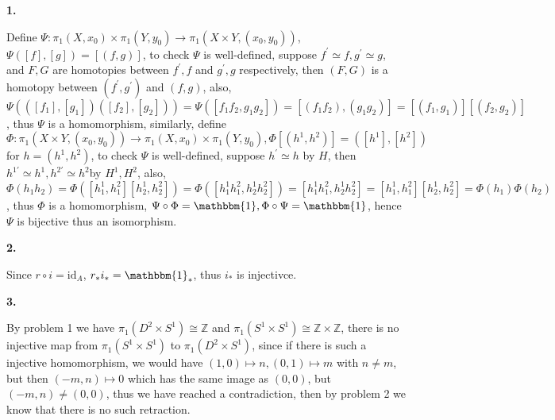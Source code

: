 \documentclass[12pt]{article}
\begin{document}
\textbf{1.} \par
Define $\Psi:\pi_{1}(X,x_{0})\times\pi_{1}(Y,y_{0})\rightarrow \pi_{1}\left(X\times Y,(x_{0},y_{0})\right)$, $\Psi([f],[g])=[(f,g)]$, to check $\Psi$ is well-defined, suppose $f^{'}\simeq f, g^{'}\simeq g$, and $F,G$ are homotopies between $f^{'},f$ and $g^{'},g$ respectively, then $(F,G)$ is a homotopy between $(f^{'},g^{'})$ and \((f,g)\), also, $\Psi\left(([f_{1}],[g_{1}])([f_{2}],[g_{2}])\right)=\Psi\left([f_{1}f_{2},g_{1}g_{2}]\right)=[(f_{1}f_{2}),(g_{1}g_{2})]=[(f_{1},g_{1})][(f_{2},g_{2})]$, thus $\Psi$ is a homomorphism, similarly, define $\Phi: \pi_{1}\left(X\times Y,(x_{0},y_{0})\right) \rightarrow \pi_{1}(X,x_{0})\times\pi_{1}(Y,y_{0}), \Phi[(h^{1},h^{2})]=([h^{1}],[h^{2}])$ for $h=(h^{1},h^{2})$, to check $\Psi$ is well-defined, suppose $h^{'}\simeq h$ by $H$, then $h^{1'}\simeq h^{1},h^{2'}\simeq h^{2}$by $H^{1},H^{2}$, also, $\Phi(h_{1}h_{2})=\Phi\left([h_{1}^{1},h_{1}^{2}][h_{2}^{1},h_{2}^{2}]\right)=\Phi\left([h_{1}^{1}h_{1}^{2},h_{2}^{1}h_{2}^{2}]\right)=[h_{1}^{1}h_{1}^{2},h_{2}^{1}h_{2}^{2}]=[h_{1}^{1},h_{1}^{2}][h_{2}^{1},h_{2}^{2}]=\Phi(h_{1})\Phi(h_{2})$, thus $\Phi$ is a homomorphism, $\Psi\circ\Phi=\mathbbm{1},\Phi\circ\Psi=\mathbbm{1}$, hence $\Psi$ is bijective thus an isomorphism. \par
\textbf{2.} \par
Since $r\circ i=\mathrm{id}_{A}$, $r_{*}i_{*}=\mathbbm{1}_{*}$, thus $i_{*}$ is injectivce. \par
\textbf{3.} \par
By problem 1 we have $\pi_{1}(D^{2}\times S^{1}) \cong \mathbb{Z}$ and $\pi_{1}(S^{1}\times S^{1}) \cong \mathbb{Z}\times \mathbb{Z}$, there is no injective map from $\pi_{1}(S^{1}\times S^{1})$ to $\pi_{1}(D^{2}\times S^{1})$, since if there is such a injective homomorphism, we would have $(1,0)\mapsto n, (0,1)\mapsto m $ with $n\neq m$, but then \((-m,n)\mapsto 0\) which has the same image as $(0,0)$, but $(-m,n)\neq (0,0)$, thus we have reached a contradiction, then by problem 2 we know that there is no such retraction.
\end{document}

